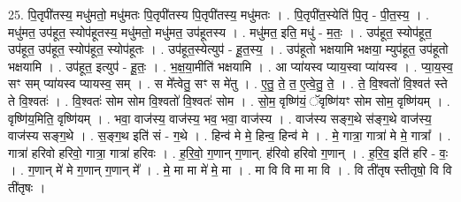 \documentclass[17pt]{extarticle}
\begin{document}
25. पि॒तृपी॑तस्य॒ मधु॑मतो॒ मधु॑मतः पि॒तृपी॑तस्य पि॒तृपी॑तस्य॒ मधु॑मतः । . पि॒तृपी॑त॒स्येति॑ पि॒तृ - पी॒त॒स्य॒ । . मधु॑मत॒ उप॑हूत॒ स्योप॑हूतस्य॒ मधु॑मतो॒ मधु॑मत॒ उप॑हूतस्य । . मधु॑मत॒ इति॒ मधु॑ - म॒तः॒ । . उप॑हूत॒ स्योप॑हूत॒ उप॑हूत॒ उप॑हूत॒ स्योप॑हूत॒ स्योप॑हूतः । . उप॑हूत॒स्येत्युप॑ - हू॒त॒स्य॒ । . उप॑हूतो भक्षयामि भक्षया॒ म्युप॑हूत॒ उप॑हूतो भक्षयामि । . उप॑हूत॒ इत्युप॑ - हू॒तः॒ । . भ॒क्ष॒या॒मीति॑ भक्षयामि । . आ प्या॑यस्व प्याय॒स्वा प्या॑यस्व । . प्या॒य॒स्व॒ सꣳ सम् प्या॑यस्व प्यायस्व॒ सम् । . स मे᳚त्वेतु॒ सꣳ स मे॑तु । . ए॒तु॒ ते॒ त॒ ए॒त्वे॒तु॒ ते॒ । . ते॒ वि॒श्वतो॑ वि॒श्वत॑ स्ते ते वि॒श्वतः॑ । . वि॒श्वतः॑ सोम सोम वि॒श्वतो॑ वि॒श्वतः॑ सोम । . सो॒म॒ वृष्णि॑यं॒ ॅवृष्णि॑यꣳ सोम सोम॒ वृष्णि॑यम् । . वृष्णि॑य॒मिति॒ वृष्णि॑यम् । . भवा॒ वाज॑स्य॒ वाज॑स्य॒ भव॒ भवा॒ वाज॑स्य । . वाज॑स्य सङ्ग॒थे स॑ङ्ग॒थे वाज॑स्य॒ वाज॑स्य सङ्ग॒थे । . स॒ङ्ग॒थ इति॑ सं - ग॒थे । . हिन्व॑ मे मे॒ हिन्व॒ हिन्व॑ मे । . मे॒ गात्रा॒ गात्रा॑ मे मे॒ गात्रा᳚ । . गात्रा॑ हरिवो हरिवो॒ गात्रा॒ गात्रा॑ हरिवः । . ह॒रि॒वो॒ ग॒णान् ग॒णान्. ह॑रिवो हरिवो ग॒णान् । . ह॒रि॒व॒ इति॑ हरि - वः॒ । . ग॒णान् मे॑ मे ग॒णान् ग॒णान् मे᳚ । . मे॒ मा मा मे॑ मे॒ मा । . मा वि वि मा मा वि । . वि ती॑तृष स्तीतृषो॒ वि वि ती॑तृषः । \newline
\end{document}
